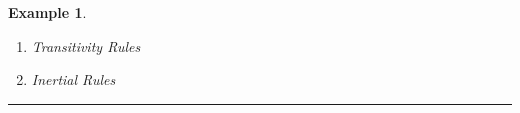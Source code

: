\documentclass[10pt, twocolumn]{article}
\newtheorem{examp}{Example}
\newenvironment{example}{\begin{examp}\rm}{\rule{2mm}{2mm}\end{examp}}
\begin{document}
\begin{example}
\begin{enumerate}
              \begin{math}
                \begin{aligned}[t]
                  \hat{holds}&(alice, read, file, S_{1}) \leftarrow \\
                  & \hat{holds}(grp, read, file, S_{1}), \\
                  & \hat{memb}(alice, grp, S_{1}), \\
                  & not \lnot \hat{holds}(alice, read, file, S_{1}) \\
                  \lnot \hat{holds}&(alice, read, file, S_{1}) \leftarrow \\
                  & \lnot \hat{holds}(grp, read, file, S_{1}), \\
                  & \hat{memb}(alice, grp, S_{1})
                 \end{aligned}
              \end{math}

              \begin{math}
                \begin{aligned}[t]
                  \hat{holds}&(alice, write, file, S_{1}) \leftarrow \\
                  & \hat{holds}(grp, write, file, S_{1}), \\
                  & \hat{memb}(alice, grp, S_{1}), \\
                  & not \lnot \hat{holds}(alice, write, file, S_{1}) \\
                  \lnot \hat{holds}&(alice, write, file, S_{1}) \leftarrow \\
                  & \lnot \hat{holds}(grp, write, file, S_{1}), \\
                  & \hat{memb}(alice, grp, S_{1})
                \end{aligned}
              \end{math}

            \item
              Transitivity Rules

            \item
              Inertial Rules


\end{enumerate}
\end{example}
\end{document}
